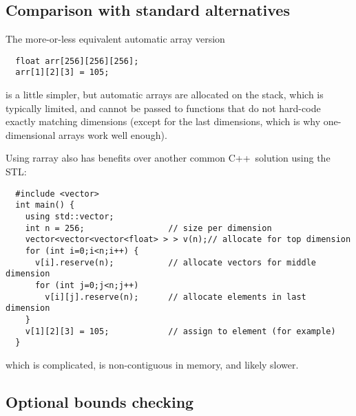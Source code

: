 \documentclass[12pt,twoside]{article}
\newcommand{\cxx}{C{++}}
\begin{document}
\subsection{Comparison with standard alternatives}

The more-or-less equivalent automatic array version 
\vspace{-5pt}\begin{framed}\vspace{-14pt}%
\begin{verbatim}
  float arr[256][256][256]; 
  arr[1][2][3] = 105;
\end{verbatim}
\vspace{-14pt}\end{framed}
\noindent
is a little simpler, but automatic arrays are allocated on the stack,
which is typically limited, and cannot be passed to functions that do
not hard-code exactly matching dimensions (except for the last
dimensions, which is why one-dimensional arrays work well enough).

Using rarray also has benefits over another common \cxx\ 
solution using the STL:
\vspace{-5pt}\begin{framed}\vspace{-14pt}%
\begin{verbatim}
  #include <vector>
  int main() {
    using std::vector;
    int n = 256;                 // size per dimension
    vector<vector<vector<float> > > v(n);// allocate for top dimension
    for (int i=0;i<n;i++) {
      v[i].reserve(n);           // allocate vectors for middle dimension
      for (int j=0;j<n;j++) 
        v[i][j].reserve(n);      // allocate elements in last dimension
    }
    v[1][2][3] = 105;            // assign to element (for example)
  }
\end{verbatim}
\vspace{-14pt}\end{framed}\vspace{-8pt}
\noindent
which is complicated, is non-contiguous in memory, and likely
slower. 

\subsection{Optional bounds checking}
\end{document}

